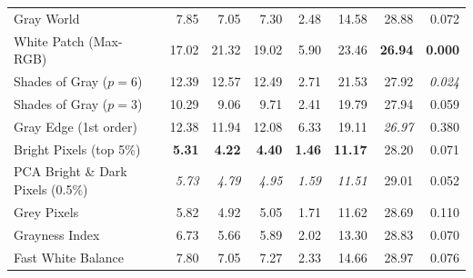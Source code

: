 \begin{longtable}{@{}>{\raggedright\arraybackslash}p{6.8cm}rrrrrrr@{}}
Gray World~\cite{gray_world} & 7.85 & 7.05 & 7.30 & 2.48 & 14.58 & 28.88 & 0.072 \\
White Patch (Max-RGB)~\cite{white_patch} & 17.02 & 21.32 & 19.02 & 5.90 & 23.46 & \textbf{26.94} & \textbf{0.000} \\
Shades of Gray ($p=6$)~\cite{shades_of_gray} & 12.39 & 12.57 & 12.49 & 2.71 & 21.53 & 27.92 & \textit{0.024} \\
Shades of Gray ($p=3$)~\cite{shades_of_gray} & 10.29 & 9.06 & 9.71 & 2.41 & 19.79 & 27.94 & 0.059 \\
Gray Edge (1st order)~\cite{gray_edge} & 12.38 & 11.94 & 12.08 & 6.33 & 19.11 & \textit{26.97} & 0.380 \\
Bright Pixels (top 5\%)~\cite{bright_pixels} & \textbf{5.31} & \textbf{4.22} & \textbf{4.40} & \textbf{1.46} & \textbf{11.17} & 28.20 & 0.071 \\
PCA Bright \& Dark Pixels (0.5\%)~\cite{cheng2014illuminant} & \textit{5.73} & \textit{4.79} & \textit{4.95} & \textit{1.59} & \textit{11.51} & 29.01 & 0.052 \\
Grey Pixels~\cite{yangGrayPixels} & 5.82 & 4.92 & 5.05 & 1.71 & 11.62 & 28.69 & 0.110 \\
Grayness Index~\cite{qianFindingGrayPixels} & 6.73 & 5.66 & 5.89 & 2.02 & 13.30 & 28.83 & 0.070 \\
Fast White Balance~\cite{fast_wb_greyness} & 7.80 & 7.05 & 7.27 & 2.33 & 14.66 & 28.97 & 0.076 \\
\end{longtable}
\endgroup

